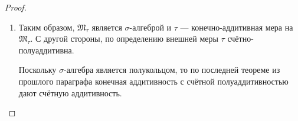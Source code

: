 \begin{proof}
\begin{enumerate}
        Пусть $n \in \N$ произвольно.
        \[\tau(E) \geqslant \tau\left(E \cap \bigsqcup\limits_{i=1}^{n}A_i\right) + \underbrace{\tau\left(E \setminus \bigsqcup\limits_{i=1}^{n} A_i\right)}_{\geqslant \tau\left(E \setminus \bigsqcup\limits_{i=1}^{\infty} A_i\right)} \geqslant\]
        в силу монотонности $\tau$ и \eqref{eq:3main2}
        \[\geqslant \sum\limits_{i=1}^{n} \tau(E \cap A_i) + \tau(E \setminus A).\]
        Теперь, взяв супремум по $n \in \N$ от обеих частей, получим:
        \begin{multline*}
            \tau(E) \geqslant \sum\limits_{i=1}^{\infty} \tau(E \cap A_i) + \tau(E \setminus A) \geqslant \tau\left(\bigsqcup\limits_{i=1}^{\infty} E \cap A_i\right) + \tau(E \setminus A) =\\=
            \tau\left(E \cap \bigsqcup\limits_{i=1}^{\infty} A_i\right) + \tau(E \setminus A) = \tau(E \cap A) + \tau(E \setminus A) \Longrightarrow A \in \mathfrak{M}_{\tau}.
        \end{multline*}
        Если 
        \[A = \bigcup\limits_{i=1}^{\infty} \underbrace{B_i}_{\in \mathfrak{M}_{\tau}}, \ A_1 = B_1, \ \underbrace{A_2}_{\in \mathfrak{M}_{\tau}} = B_2 \setminus B_1, \dots, A_n = B_n \setminus \bigcup\limits_{i=1}^{n-1} B_i,\]
        то по редукции к только что доказанному:
        \[A = \bigcup\limits_{i=1}^{\infty} B_i = \bigsqcup\limits_{i=1}^{\infty} A_i.\]

        \item Таким образом, $\mathfrak{M}_{\tau}$ является $\sigma$-алгеброй и $\tau$ — конечно-аддитивная мера на $\mathfrak{M}_{\tau}$.
        С другой стороны, по определению внешней меры $\tau$ счётно-полуаддитивна.

        Поскольку $\sigma$-алгебра является полукольцом, то по последней теореме из прошлого параграфа конечная аддитивность с счётной полуаддитивностью дают счётную аддитивность.
    \end{enumerate}
    
    
\end{proof} 